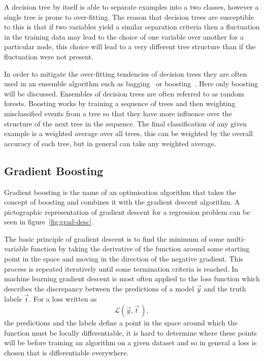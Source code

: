 A decision tree by itself is able to separate examples into a two classes,
however a single tree is prone to over-fitting.  The reason that decision trees
are susceptible to this is that if two variables yield a similar separation
criteria then a fluctuation in the training data may lead to the choice of one
variable over another for a particular node, this choice will lead to a very
different tree structure than if the fluctuation were not present.

In order to mitigate the over-fitting tendencies of decision trees they are
often used in an ensemble algorithm such as bagging~\cite{Bagging}
or boosting~\cite{Boosting}. Here only boosting will be discussed. Ensembles of
decision trees are often referred to as random forests. Boosting works by
training a sequence of trees and then weighting misclassified events from a tree
so that they have more influence over the structure of the next tree in the
sequence. The final classification of any given example is a weighted average
over all trees, this can be weighted by the overall accuracy of each tree, but
in general can take any weighted average.

\subsection{Gradient Boosting}

Gradient boosting is the name of an optimisation algorithm that takes the
concept of boosting and combines it with the gradient descent algorithm. A
pictographic representation of gradient descent for a regression problem can be
seen in figure~\ref{fig:grad-desc}.

The basic principle of gradient descent is to find the minimum of some
multi-variable function by taking the derivative of the function around some
starting point in the space and moving in the direction of the negative
gradient. This process is repeated iteratively until some termination criteria
is reached. In machine learning gradient descent is most often applied to the
loss function which describes the discrepancy between the predictions of a model
$\vec{y}$ and the truth labels $\vec{t}$. For a loss written as
\begin{equation}
  \mathcal{L}(\vec{y}, \vec{t} \,),
\end{equation}
the predictions and the labels define a point in the space around which the
function must be locally differentiable, it is hard to determine where these
points will be before training an algorithm on a given dataset and so in general
a loss is chosen that is differentiable everywhere.

